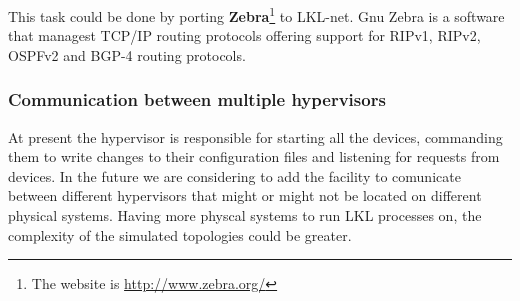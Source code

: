 This task could be done by porting \textbf{Zebra}\footnote{The website is \url{http://www.zebra.org/}} to LKL-net. Gnu Zebra is a software that managest TCP/IP routing protocols offering support for  RIPv1, RIPv2, OSPFv2 and BGP-4 routing protocols.

\subsubsection{Communication between multiple hypervisors}
\label{sec:hypervisor-comm}
At present the hypervisor is responsible for starting all the devices, commanding them to write changes to their configuration files and listening for requests from devices. In the future we are considering to add the facility to comunicate between different hypervisors that might or might not be located on different physical systems. Having more physcal systems to run LKL processes on, the complexity of the simulated topologies could be greater.
